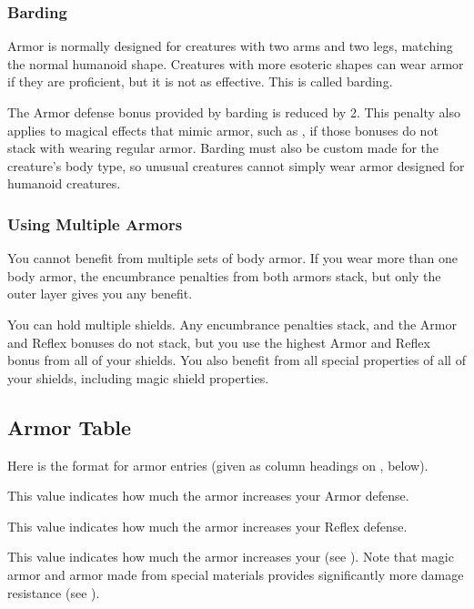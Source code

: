     \subsubsection{Barding}\label{Barding}
      Armor is normally designed for creatures with two arms and two legs, matching the normal humanoid shape.
      Creatures with more esoteric shapes can wear armor if they are proficient, but it is not as effective.
      This is called barding.

      The Armor defense bonus provided by barding is reduced by 2.
      This penalty also applies to magical effects that mimic armor, such as , if those bonuses do not stack with wearing regular armor.
      Barding must also be custom made for the creature's body type, so unusual creatures cannot simply wear armor designed for humanoid creatures.

    \subsubsection{Using Multiple Armors}
      You cannot benefit from multiple sets of body armor.
      If you wear more than one body armor, the encumbrance penalties from both armors stack, but only the outer layer gives you any benefit.

      You can hold multiple shields.
      Any encumbrance penalties stack, and the Armor and Reflex bonuses do not stack, but you use the highest Armor and Reflex bonus from all of your shields.
      You also benefit from all special properties of all of your shields, including magic shield properties.

  \subsection{Armor Table}
    \par Here is the format for armor entries (given as column headings on , below).

     This value indicates how much the armor increases your Armor defense.

     This value indicates how much the armor increases your Reflex defense.

     This value indicates how much the armor increases your  (see ).
    Note that magic armor and armor made from special materials provides significantly more damage resistance (see ).

